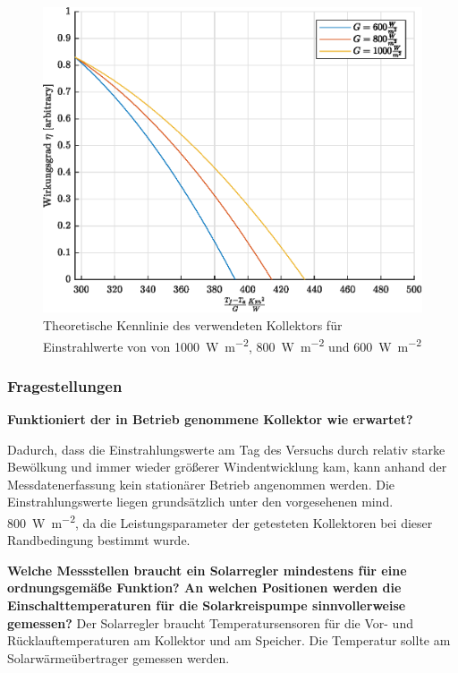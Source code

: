 \begin{figure}[H]
	\centering
	\includegraphics[height=0.3\textheight]{../DATA/KennlinieTheo.eps}
	\caption[Theoretische Kennlinie des verwendeten Kollektors für Einstrahlwerte von von \SI{1000}{\watt\per\meter\squared}, \SI{800}{\watt\per\meter\squared} und \SI{600}{\watt\per\meter\squared}]{Theoretische Kennlinie des verwendeten Kollektors für Einstrahlwerte von von \SI{1000}{\watt\per\meter\squared}, \SI{800}{\watt\per\meter\squared} und \SI{600}{\watt\per\meter\squared}}
	\label{fig:KennKoll}
\end{figure}


\subsubsection{Fragestellungen}

\textbf{Funktioniert der in Betrieb genommene Kollektor wie erwartet?}

Dadurch, dass die Einstrahlungswerte am Tag des Versuchs durch relativ starke Bewölkung und immer wieder größerer Windentwicklung kam, kann anhand der Messdatenerfassung kein stationärer Betrieb angenommen werden. Die Einstrahlungswerte liegen grundsätzlich unter den vorgesehenen mind. \SI{800}{\watt\per\meter\squared}, da die Leistungsparameter der getesteten Kollektoren bei dieser Randbedingung bestimmt wurde. 

\textbf{Welche Messstellen braucht ein Solarregler mindestens für eine ordnungsgemäße
	Funktion? An welchen Positionen werden die Einschalttemperaturen für die Solarkreispumpe
	sinnvollerweise gemessen?}
Der Solarregler braucht Temperatursensoren für die Vor- und Rücklauftemperaturen am Kollektor und am Speicher. Die Temperatur sollte am Solarwärmeübertrager gemessen werden. 

